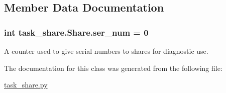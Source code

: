 \subsection{Member Data Documentation}
\subsubsection[{\texorpdfstring{ser\+\_\+num}{ser_num}}]{\setlength{\rightskip}{0pt plus 5cm}int task\+\_\+share.\+Share.\+ser\+\_\+num = 0\hspace{0.3cm}{\ttfamily [static]}}\hypertarget{classtask__share_1_1Share_a2e8df029af46fbfd44ef0c2e7e8c7af6}{}\label{classtask__share_1_1Share_a2e8df029af46fbfd44ef0c2e7e8c7af6}


A counter used to give serial numbers to shares for diagnostic use. 



The documentation for this class was generated from the following file\+:\begin{DoxyCompactItemize}
\item 
\hyperlink{task__share_8py}{task\+\_\+share.\+py}\end{DoxyCompactItemize}
